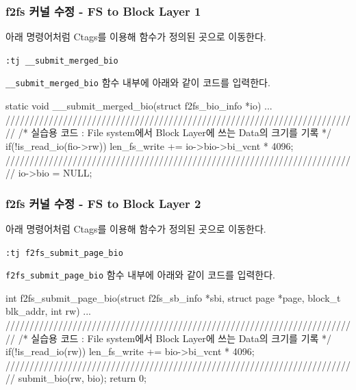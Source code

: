 \documentclass[newPxFont,sthlmFooter,nooffset]{beamer}
\begin{document}
\begin{frame}[containsverbatim,t]
  \frametitle{f2fs 커널 수정 - FS to Block Layer 1}
아래 명령어처럼 Ctags를 이용해 함수가 정의된 곳으로 이동한다.
\begin{mdframed}[backgroundcolor=lightgray,hidealllines=true]
\texttt{\textcolor[rgb]{0,0,0}{:tj \_\_submit\_merged\_bio}}
\end{mdframed}
\bigskip
\texttt{\_\_submit\_merged\_bio} 함수 내부에 아래와 같이 코드를 입력한다.
\begin{codedef}

static void __submit_merged_bio(struct f2fs_bio_info *io)
{
        ...
//////////////////////////////////////////////////////////////////////////       
/* 실습용 코드 : File system에서 Block Layer에 쓰는 Data의 크기를 기록 */
        if(!is_read_io(fio->rw)){
                len_fs_write += io->bio->bi_vcnt * 4096;
        }
//////////////////////////////////////////////////////////////////////////    
        io->bio = NULL;
}
\end{codedef}
\end{frame}

\begin{frame}[containsverbatim,t]
  \frametitle{f2fs 커널 수정 - FS to Block Layer 2}
아래 명령어처럼 Ctags를 이용해 함수가 정의된 곳으로 이동한다.
\begin{mdframed}[backgroundcolor=lightgray,hidealllines=true]
\texttt{\textcolor[rgb]{0,0,0}{:tj f2fs\_submit\_page\_bio}}
\end{mdframed}
\bigskip
\texttt{f2fs\_submit\_page\_bio} 함수 내부에 아래와 같이 코드를 입력한다.
\begin{codedef}

int f2fs_submit_page_bio(struct f2fs_sb_info *sbi, struct page *page,
                                        block_t blk_addr, int rw)
{
        ...
//////////////////////////////////////////////////////////////////////////       
/* 실습용 코드 : File system에서 Block Layer에 쓰는 Data의 크기를 기록 */
        if(!is_read_io(rw)){
                len_fs_write += bio->bi_vcnt * 4096;
        }
//////////////////////////////////////////////////////////////////////////    
        submit_bio(rw, bio);
        return 0;
}
\end{codedef}
\end{frame}
\end{document}
